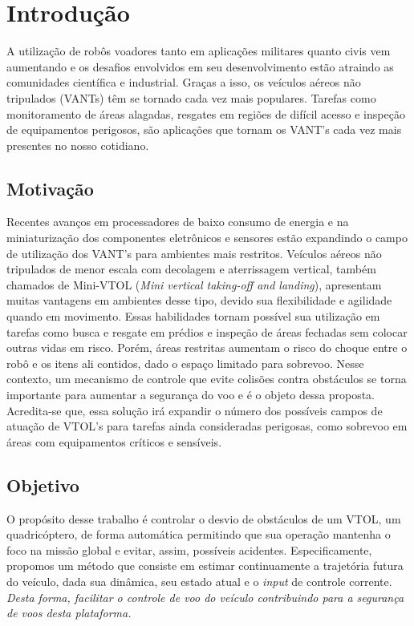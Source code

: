\documentclass[a4paper, 12pt]{article}
\begin{document}
\newpage

\section{Introdução}

A utilização de robôs voadores tanto em aplicações militares quanto civis vem aumentando e os desafios envolvidos em seu desenvolvimento estão atraindo as comunidades científica e industrial. Graças a isso, os veículos aéreos não tripulados (VANTs) têm se tornado cada vez mais populares. Tarefas como monitoramento de áreas alagadas, resgates em regiões de difícil acesso e inspeção de equipamentos perigosos, são aplicações que tornam os VANT's cada vez mais presentes no nosso cotidiano.

\subsection{Motivação}

Recentes avanços em processadores de baixo consumo de energia e na miniaturização dos componentes eletrônicos e sensores estão expandindo o campo de utilização dos VANT's para ambientes mais restritos. Veículos aéreos não tripulados de menor escala com decolagem e aterrissagem vertical, também chamados de Mini-VTOL (\textit{Mini vertical taking-off and landing}), apresentam muitas vantagens em ambientes desse tipo, devido sua flexibilidade e agilidade quando em movimento. Essas habilidades tornam possível sua utilização em tarefas como busca e resgate em prédios e inspeção de áreas fechadas sem colocar outras vidas em risco. Porém, áreas restritas aumentam o risco do choque entre o robô e os itens ali contidos, dado o espaço limitado para sobrevoo. Nesse contexto, um mecanismo de controle que evite colisões contra obstáculos se torna importante para aumentar a segurança do voo e é o objeto dessa proposta. Acredita-se que, essa solução irá expandir o número dos possíveis campos de atuação de VTOL's para tarefas ainda consideradas perigosas, como sobrevoo em áreas com equipamentos críticos e sensíveis.



\subsection{Objetivo}

O propósito desse trabalho é controlar o desvio de obstáculos de um VTOL, um quadricóptero, de forma automática permitindo que sua operação mantenha o foco na missão global e evitar, assim, possíveis acidentes. Especificamente, propomos um método que consiste em estimar continuamente a trajetória futura do veículo, dada sua dinâmica, seu estado atual e o \textit{input} de controle corrente. \emph{Desta forma, facilitar o controle de voo do veículo contribuindo para a segurança de voos desta plataforma.} 
\end{document}
